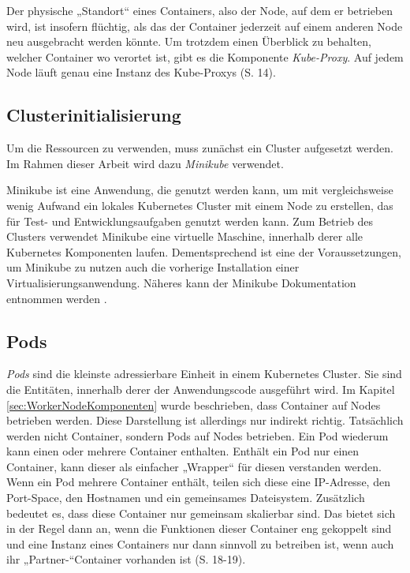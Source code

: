 \documentclass[11pt,a4paper]{article}
\begin{document}
Der physische „Standort“ eines Containers, also der Node, auf dem er betrieben wird, ist insofern
flüchtig, als das der Container jederzeit auf einem anderen Node neu ausgebracht werden könnte.
Um trotzdem einen Überblick zu behalten, welcher Container wo verortet ist, gibt es die Komponente
\emph{Kube-Proxy}. Auf jedem Node läuft genau eine Instanz des Kube-Proxys \cite{Schmeling_Dargatz_2022} (S. 14).

\subsection{Clusterinitialisierung}
Um die Ressourcen zu verwenden, muss zunächst ein Cluster aufgesetzt werden.
Im Rahmen dieser Arbeit wird dazu \emph{Minikube} verwendet.

Minikube ist eine Anwendung, die genutzt werden kann, um mit vergleichsweise wenig Aufwand ein lokales
Kubernetes Cluster mit einem Node zu erstellen, das für Test- und Entwicklungsaufgaben genutzt werden kann.
Zum Betrieb des Clusters verwendet Minikube eine virtuelle Maschine, innerhalb derer
alle Kubernetes Komponenten laufen. Dementsprechend ist eine der Voraussetzungen,
um Minikube zu nutzen auch die vorherige Installation einer Virtualisierungsanwendung.
Näheres kann der Minikube Dokumentation entnommen werden \cite{minikube}.

\subsection{Pods}
\emph{Pods} sind die kleinste adressierbare Einheit in einem Kubernetes Cluster.
Sie sind die Entitäten, innerhalb derer der Anwendungscode ausgeführt wird.
Im Kapitel \ref{sec:WorkerNodeKomponenten} wurde beschrieben, dass Container auf Nodes betrieben werden.
Diese Darstellung ist allerdings nur indirekt richtig. Tatsächlich werden nicht Container,
sondern Pods auf Nodes betrieben.
Ein Pod wiederum kann einen oder mehrere Container enthalten. Enthält ein Pod nur einen Container,
kann dieser als einfacher „Wrapper“ für diesen verstanden werden.
Wenn ein Pod mehrere Container enthält, teilen sich diese eine IP-Adresse,
den Port-Space, den Hostnamen und ein gemeinsames Dateisystem.
Zusätzlich bedeutet es, dass diese Container nur gemeinsam skalierbar sind.
Das bietet sich in der Regel dann an, wenn die Funktionen dieser Container eng gekoppelt sind und eine Instanz eines
Containers nur dann sinnvoll zu betreiben ist, wenn auch ihr „Partner-“Container vorhanden ist \cite{9783969109625} \cite{Schmeling_Dargatz_2022} (S. 18-19).
\end{document}
